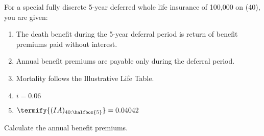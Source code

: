  For a special fully discrete 5-year deferred whole life insurance of 100,000 on (40), you are
given:
\begin{enumerate}
\item The death benefit during the 5-year deferral period is return of benefit premiums paid
  without interest.
\item Annual benefit premiums are payable only during the deferral period.
\item Mortality follows the Illustrative Life Table.
\item $i = 0.06$
\item $\termify{(IA)_{40:\halfbox{5}}}= 0.04042$
\end{enumerate}
Calculate the annual benefit premiums.
